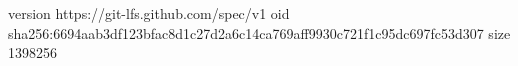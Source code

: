 version https://git-lfs.github.com/spec/v1
oid sha256:6694aab3df123bfac8d1c27d2a6c14ca769aff9930c721f1c95dc697fc53d307
size 1398256
